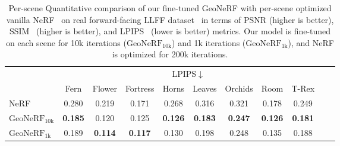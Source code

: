 \begin{table}[!t]
    \begin{center}
        \begin{threeparttable}
            \begin{tabular}{l|cccccccccc}
            & \multicolumn{8}{c}{LPIPS$\downarrow$} \\
            &  Fern & Flower & Fortress & Horns & Leaves & Orchids & Room & T-Rex \\
            \hline
            NeRF & 0.280 & 0.219 & 0.171 & 0.268 & 0.316 & 0.321 & 0.178 & 0.249 \\
            $\text{GeoNeRF}_{\text{10k}}$ & \textbf{0.185} & 0.120 & 0.125 & \textbf{0.126} & \textbf{0.183} & \textbf{0.247} & \textbf{0.126} & \textbf{0.181} \\
            $\text{GeoNeRF}_{\text{1k}}$ & 0.189 & \textbf{0.114} & \textbf{0.117} & 0.130 & 0.198 & 0.248 & 0.135 & 0.188 \\            
            \hline
            \end{tabular}
        \end{threeparttable}
    \end{center}
    \vspace{3.0ex}
    \caption{Per-scene Quantitative comparison of our fine-tuned GeoNeRF with per-scene optimized vanilla NeRF~\citep{mildenhall2020nerf} on real forward-facing LLFF dataset~\citep{mildenhall2019llff} in terms of PSNR (higher is better), SSIM~\citep{wang2004image} (higher is better), and LPIPS~\citep{zhang2018unreasonable} (lower is better) metrics. Our model is fine-tuned on each scene for 10k iterations ($\text{GeoNeRF}_{\text{10k}}$) and 1k iterations ($\text{GeoNeRF}_{\text{1k}}$), and NeRF is optimized for 200k iterations.}
    \label{table:per_scene_ft_llff}
\end{table}


\clearpage

